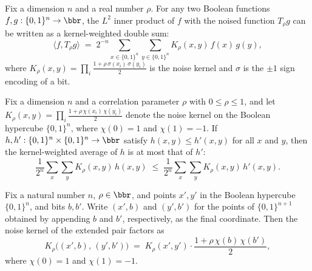 \begin{lemma}
\label{BooleanAnalysis.Hypercontractivity.innerProduct_noiseOp_eq_weighted_sum}
\leanok
{}
Fix a dimension $n$ and a real number $\rho$. For any two Boolean functions $f, g :
\{0,1\}^n \to \bbr$, the $L^2$ inner product of $f$ with the noised function $T_\rho g$
can be written as a kernel-weighted double sum:
\[
\langle f, T_\rho g\rangle \;=\; 2^{-n} \sum_{x \in \{0,1\}^n} \sum_{y \in \{0,1\}^n}
K_\rho(x,y)\, f(x)\, g(y),
\]
where $K_\rho(x,y) = \prod_{i} \tfrac{1 + \rho\,\sigma(x_i)\,\sigma(y_i)}{2}$ is the
noise kernel and $\sigma$ is the $\pm 1$ sign encoding of a bit.
\end{lemma}

\begin{lemma}
\label{BooleanAnalysis.Hypercontractivity.corrExpect_mono}
\leanok
{}
Fix a dimension $n$ and a correlation parameter $\rho$ with $0 \le \rho \le 1$, and let
$K_\rho(x,y) = \prod_{i} \tfrac{1 + \rho\,\chi(x_i)\,\chi(y_i)}{2}$ denote the noise
kernel on the Boolean hypercube $\{0,1\}^n$, where $\chi(0)=1$ and $\chi(1)=-1$. If $h, h' : \{0,1\}^n \times \{0,1\}^n \to \bbr$ satisfy $h(x,y) \le h'(x,y)$
for all $x$ and $y$, then the kernel-weighted average of $h$ is at most that of $h'$:
\[
  \frac{1}{2^n}\sum_{x}\sum_{y} K_\rho(x,y)\, h(x,y)
  \;\le\;
  \frac{1}{2^n}\sum_{x}\sum_{y} K_\rho(x,y)\, h'(x,y).
\]
\end{lemma}

\begin{lemma}
\label{BooleanAnalysis.Hypercontractivity.noiseKernel_snoc}
\leanok
{}
Fix a natural number $n$, $\rho \in \bbr$, and points $x', y'$ in the Boolean hypercube $\{0,1\}^n$, and bits $b,
b'$. Write $(x', b)$ and $(y', b')$ for the points of $\{0,1\}^{n+1}$ obtained by
appending $b$ and $b'$, respectively, as the final coordinate. Then the noise kernel of
the extended pair factors as
\[
  K_\rho\bigl((x', b),\, (y', b')\bigr)
  \;=\; K_\rho(x', y') \cdot \frac{1 + \rho\,\chi(b)\,\chi(b')}{2},
\]
where $\chi(0)=1$ and $\chi(1)=-1$.
\end{lemma}

